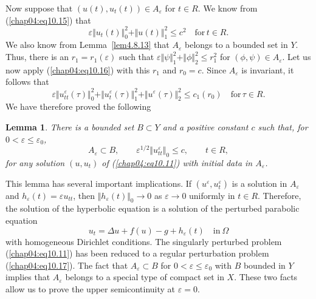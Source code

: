 \documentclass{surv-l}
\theoremstyle{plain}
\newtheorem{lemma}[theorem]{Lemma}
\theoremstyle{definition}
\numberwithin{equation}{section}
\numberwithin{figure}{chapter}
\begin{document}
Now suppose that $(u(t), u_{t}(t))\in A_{\varepsilon}$ for $t\in R$. We know from (\ref{chap04:eq10.15}) that
\begin{equation*}
\varepsilon\Vert u_{t}(t)\Vert_{0}^{2}+\Vert u(t)\Vert_{1}^{2}\leq c^{2}\quad \mathrm{for}\, t\in R.
\end{equation*}
We also know from Lemma~\ref{lem4.8.13} that $A_{\varepsilon}$ belongs to a bounded set in $Y$. Thus, there is an $r_{1}=r_{1}(\varepsilon)$ such that $\varepsilon\Vert\psi\Vert_{1}^{2}+\Vert\phi\Vert_{2}^{2}\leq r_{1}^{2}$ for $(\phi, \psi)\in A_{\varepsilon}$. Let us now apply (\ref{chap04:eq10.16}) with this $r_{1}$ and $r_{0}=c$. Since $A_{\varepsilon}$ is invariant, it follows that
\begin{equation*}
\varepsilon\Vert u_{tt}^{\varepsilon}(\tau)\Vert_{0}^{2}+\Vert u_{t}^{\varepsilon}(\tau)\Vert_{1}^{2}+\Vert u^{\varepsilon}(\tau)\Vert_{2}^{2}\leq c_{1}(r_{0})\quad \mathrm{for}\, \tau\in R.
\end{equation*}
We have therefore proved the following

\begin{lemma}\label{lem4.10.7} There is a bounded set $B\subset Y$ and a positive constant $c$ such that, for $ 0<\varepsilon\leq\varepsilon_{0}$,
\begin{equation*}
A_{\varepsilon}\subset B,\quad\quad \varepsilon^{1/2}\Vert u_{tt}^{\varepsilon}\Vert_{0}\leq c,\quad\quad t\in R,
\end{equation*}
for any solution $(u, u_{t})$ of \emph{(\ref{chap04:eq10.11})} with initial data in $A_{\varepsilon}$.
\end{lemma}

This lemma has several important implications. If $(u^{\varepsilon}, u_{t}^{\varepsilon})$ is a solution in $A_{\varepsilon}$ and $h_{\varepsilon}(t)=\varepsilon u_{tt}$, then $\Vert h_{\varepsilon}(t)\Vert_{0}\rightarrow 0$ as $\varepsilon \rightarrow 0$ uniformly in $t\in R$. Therefore, the solution of the hyperbolic equation is a solution of the perturbed parabolic equation
\begin{equation}\label{chap04:eq10.17}
u_{t}=\Delta u+f(u)-g+h_{\varepsilon}(t)\quad \mathrm{in}\ \Omega
\end{equation}
with homogeneous Dirichlet conditions. The singularly perturbed problem (\ref{chap04:eq10.11}) has been reduced to a regular perturbation problem (\ref{chap04:eq10.17}). The fact that $A_{\varepsilon}\subset B$ for $0<\varepsilon\leq\varepsilon_{0}$ with $B$ bounded in $Y$ implies that $A_{\varepsilon}$ belongs to a special type of compact set in $X$. These two facts allow us to prove the upper semicontinuity at $\varepsilon=0$.
\end{document}
